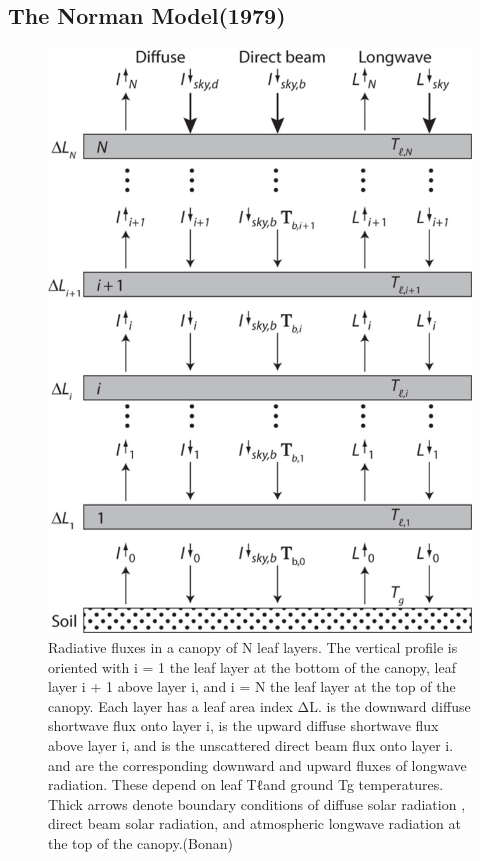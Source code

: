 \documentclass[12pt,oneside]{book}
\begin{document}
\subsection{The Norman Model(1979)}\label{the-norman-model1979}

\begin{figure}

{\centering \includegraphics[width=0.8\linewidth]{figures/chap3/f319_Norman} 

}

\caption{Radiative fluxes in a canopy of N leaf layers. The vertical profile is oriented with i = 1 the leaf layer at the bottom of the canopy, leaf layer i + 1 above layer i, and i = N the leaf layer at the top of the canopy. Each layer has a leaf area index ΔL. is the downward diffuse shortwave flux onto layer i, is the upward diffuse shortwave flux above layer i, and is the unscattered direct beam flux onto layer i. and are the corresponding downward and upward fluxes of longwave radiation. These depend on leaf Tℓand ground Tg temperatures. Thick arrows denote boundary conditions of diffuse solar radiation , direct beam solar radiation, and atmospheric longwave radiation at the top of the canopy.(Bonan)}\label{fig:f319}
\end{figure}
\end{document}
